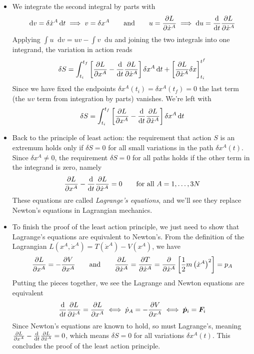 \documentclass[11pt, a4paper]{article}
\newcommand{\eqtext}[1]{\qquad \text{#1} \qquad}
\newcommand{\diff}{\mathop{}\!\mathrm{d}} %
\newcommand{\bdot}[1]{\dot{\bm{#1}}} %
\begin{document}
\begin{itemize}
	\item We integrate the second integral by parts with 
	\begin{equation*}
		\diff v = \delta \dot{x}^{A} \diff t \implies v = \delta x^{A} \eqtext{and} u = \pdv{L}{\dot{x}^{A}}  \implies \diff u = \dv{}{t}\pdv{L}{\dot{x}^{A}}
	\end{equation*}
	Applying $ \int u \diff v = uv - \int v \diff u $ and joining the two integrals into one integrand, the variation in action reads 
	\begin{equation*}
		\delta S = \int_{t_{i}}^{t_{f}}\left[\pdv{L}{x^{A}} - \dv{}{t}\pdv{L}{\dot{x}^{A}} \right] \delta x^{A} \diff t + \left[\pdv{L}{\dot{x}^{A}} \delta x\right]_{t_{i}}^{t^{f}}
	\end{equation*}
	Since we have fixed the endpoints $ \delta x^{A}(t_{i}) = \delta x^{A}(t_{f}) = 0 $ the last term (the $ uv $ term from integration by parts) vanishes. We're left with
	\begin{equation*}
		\delta S = \int_{t_{i}}^{t_{f}}\left[\pdv{L}{x^{A}} - \dv{}{t}\pdv{L}{\dot{x}^{A}} \right] \delta x^{A} \diff t
	\end{equation*}
	
	\item Back to the principle of least action: the requirement that action $ S $ is an extremum holds only if $ \delta S = 0 $ for all small variations in the path $ \delta x^{A}(t) $. Since $ \delta x^{A} \neq 0 $, the requirement $ \delta S = 0 $ for all paths holds if the other term in the integrand is zero, namely
	\begin{equation*}
		\pdv{L}{x^{A}} - \dv{}{t}\pdv{L}{\dot{x}^{A}} = 0 \qquad \text{for all } A = 1, \ldots, 3N
	\end{equation*}
	These equations are called \textit{Lagrange's equations}, and we'll see they replace Newton's equations in Lagrangian mechanics. 
	
	\item To finish the proof of the least action principle, we just need to show that Lagrange's equations are equivalent to Newton's. From the definition of the Lagrangian $ L(x^{A}, \dot{x}^{A}) = T(\dot{x}^{A}) - V(x^{A}) $, we have
	\begin{equation*}
		\pdv{L}{x^{A}} = - \pdv{V}{x^{A}} \eqtext{and} \pdv{L}{\dot{x}^{A}} = \pdv{T}{\dot{x}^{A}} =  \pdv{}{\dot{x}^{A}}\left[\frac{1}{2}m \left (\dot{x}^{A}\right )^{2}\right] = p_{A}
	\end{equation*}
	Putting the pieces together, we see the Lagrange and Newton equations are equivalent 
	\begin{equation*}
		\dv{}{t}\pdv{L}{\dot{x}^{A}} = \pdv{L}{x^{A}}  \iff \dot{p}_{A} = - \pdv{V}{x^{A}} \iff \bdot{p}_{i} = \bm{F}_{i}
	\end{equation*}
	Since Newton's equations are known to hold, so must Lagrange's, meaning $ \pdv{L}{x^{A}} - \dv{}{t}\pdv{L}{\dot{x}^{A}} = 0 $, which means $ \delta S = 0 $ for all variations $ \delta x^{A}(t) $. This concludes the proof of the least action principle.
	
\end{itemize}
\end{document}

